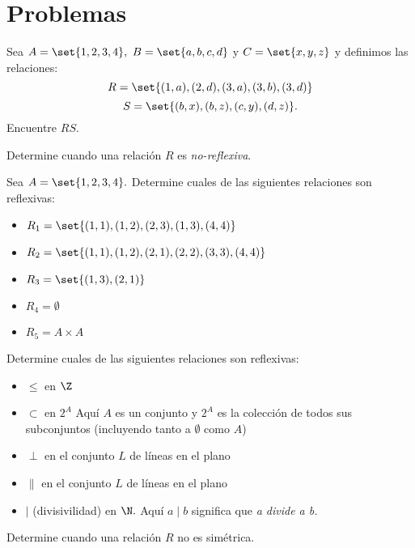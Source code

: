 \section*{Problemas}

\begin{problema}
Sea $A=\set{1,2,3,4},$ $B=\set{a,b,c,d}$ y $C=\set{x,y,z}$ y definimos las relaciones: 
$$R=\set{(1,a),(2,d),(3,a),(3,b),(3,d)}$$  $$S=\set{(b,x),(b,z),(c,y),(d,z)}.$$ Encuentre $RS.$
\end{problema}

	\begin{problema}
	Determine cuando una relación $R$ es \emph{no-reflexiva}.
\end{problema}

\begin{problema}
	\label{lip:exmp:2.5}
	Sea $A=\set{1,2,3,4}.$ Determine cuales de las siguientes relaciones son reflexivas:
	\begin{itemize}
		\item $R_{1}=\set{(1,1),(1,2),(2,3),(1,3),(4,4)}$ 
		\item $R_{2}=\set{(1,1),(1,2),(2,1),(2,2),(3,3),(4,4)}$ 
		\item $R_{3}=\set{(1,3),(2,1)}$
		\item $R_{4}=\emptyset$
		\item $R_{5}=A \times A$
	\end{itemize}
	
\end{problema}




\begin{problema}
	\label{lip:exmp:2.6}
	Determine cuales de las siguientes relaciones son reflexivas:
	\begin{itemize}
		\item $\leq$ en $\Z$ 
		\item $\subset$ en $2^{A}$ 
		Aquí $A$ es un conjunto y $2^{A}$ es la colección de todos sus subconjuntos (incluyendo tanto a $\emptyset$ como $A$) 
		\item $\perp$ en el conjunto $L$ de líneas en el plano 
		\item $\parallel$ en el conjunto $L$ de líneas en el plano 
		\item $\mid$ (divisivilidad) en $\N.$  Aquí $a\mid b$ significa que \emph{a divide a b.} 
	\end{itemize} 
\end{problema}

	
\begin{problema}
	Determine cuando una relación $R$ no es sim\'etrica.
\end{problema}




